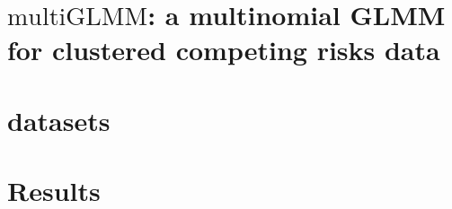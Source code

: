 \documentclass[12pt, %
               openright, %
               oneside, %
               a4paper, %
               chapter=TITLE, %
               section=TITLE, %
               brazil,
               english %
]{abntex2}
\begin{document}
\chapter{\(\text{multiGLMM}\): a multinomial GLMM for clustered
  competing risks data}
\label{cap:model}

\chapter{datasets}
\label{cap:datasets}

\chapter{Results}
\label{cap:results}

\end{document}
